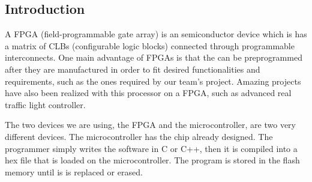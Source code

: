 
\subsection{Introduction}

A FPGA (field-programmable gate array) is an semiconductor device which is has a matrix of CLBs (configurable logic blocks) connected through programmable interconnects. One main advantage of FPGAs is that the can be preprogrammed after they are manufactured in order to fit desired functionalities and requirements, such as the ones required by our team's project. Amazing projects have also been realized with this processor on a FPGA, such as advanced real traffic light controller.

The two devices we are using, the FPGA and the microcontroller, are two very different devices. The microcontroller has the chip already designed. The programmer simply writes the software in C or C++, then it is compiled into a hex file that is loaded on the microcontroller. The program is stored in the flash memory until is is replaced or erased.

